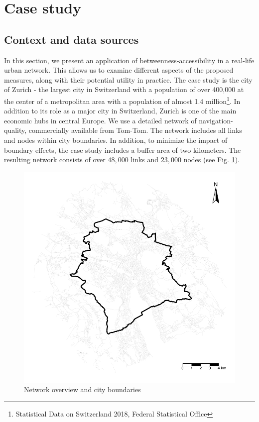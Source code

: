\documentclass[]{elsarticle} %
\begin{document}
\section{Case study}\label{case-study}

\subsection{Context and data sources}\label{context-and-data-sources}

In this section, we present an application of betweenness-accessibility
in a real-life urban network. This allows us to examine different
aspects of the proposed measures, along with their potential utility in
practice. The case study is the city of Zurich - the largest city in
Switzerland with a population of over 400,000 at the center of a
metropolitan area with a population of almost 1.4 million\footnote{Statistical
  Data on Switzerland 2018, Federal Statistical Office}. In addition to
its role as a major city in Switzerland, Zurich is one of the main
economic hubs in central Europe. We use a detailed network of
navigation-quality, commercially available from Tom-Tom. The network
includes all links and nodes within city boundaries. In addition, to
minimize the impact of boundary effects, the case study includes a
buffer area of two kilometers. The resulting network consists of over
\(48,000\) links and \(23,000\) nodes (see Fig. \ref{network}).

\begin{figure}
  \centering
  \includegraphics[width=0.6\linewidth]{Plots/network_overview.pdf}  
  \caption{Network overview and city boundaries}
  \label{network}
\end{figure}
\end{document}
